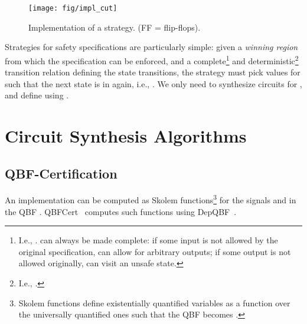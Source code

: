 \documentclass[conference]{IEEEtran}
\newcommand{\depqbf}{\textsf{DepQBF}\xspace}
\newcommand{\qbfcert}{\textsf{QBFCert}\xspace}
\begin{document}
\begin{figure}[tb]
 \centering
   \texttt{[image: fig/impl\_cut]}
   \caption{Implementation of a strategy. (FF = flip-flops).}
   \label{fig:impl}
\end{figure}

Strategies for safety specifications are particularly simple: given a 
\emph{winning region}  from which the specification can  be 
enforced, and a complete\footnote{I.e., .  can always be made 
complete: if some input is not allowed by the original specification,  can 
allow for arbitrary outputs; if some output is not allowed originally,  can 
visit an unsafe state.} and deterministic\footnote{I.e., .} transition relation 
 defining the state 
transitions, the strategy must pick values for  such that the next 
state is in  again, i.e.,
. 
We only need to synthesize circuits for , and define 
 using .


\section{Circuit Synthesis Algorithms} \label{sec:alg}

\subsection{QBF-Certification} \label{sec:qbfcert}

An implementation can be computed as Skolem functions\footnote{Skolem functions 
define existentially quantified variables as a function over the universally 
quantified ones such that the QBF becomes .} for the signals 
 and  in the QBF .  
\qbfcert~\cite{NiemetzPLSB12} computes such functions using 
\depqbf~\cite{LonsingB10}.
\end{document}
